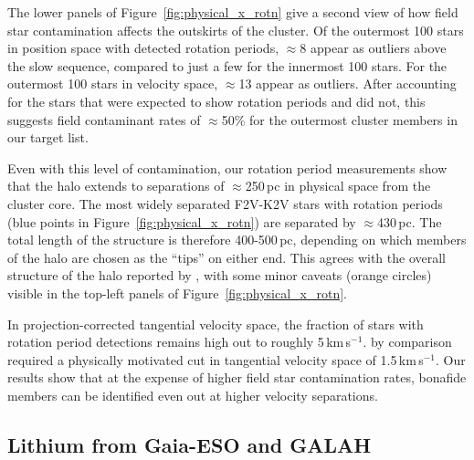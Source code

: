 \documentclass[12pt,twocolumn,tighten]{aastex63}
\newcommand{\kms}{\,km\,s$^{-1}$}
\begin{document}
The lower panels of Figure~\ref{fig:physical_x_rotn} give a second
view of how field star contamination affects the outskirts of the
cluster.  Of the outermost 100 stars in position space with detected
rotation periods, $\approx$8 appear as outliers above the slow
sequence, compared to just a few for the innermost 100 stars.  For the
outermost 100 stars in velocity space, $\approx$13 appear as outliers.
After accounting for the stars that were expected to show rotation
periods and did not, this suggests field contaminant rates of
$\approx$50\% for the outermost cluster members in our target list.

Even with this level of contamination, our rotation period
measurements show that the halo extends to separations of
$\approx$250\,pc in physical space from the cluster core.  The most
widely separated F2V-K2V stars with rotation periods (blue points in
Figure~\ref{fig:physical_x_rotn}) are separated by $\approx$430\,pc.
The total length of the structure is therefore 400-500\,pc, depending
on which members of the halo are chosen as the ``tips'' on either end.
This agrees with the overall structure of the halo reported by
, with some minor caveats (orange
circles) visible in the top-left panels of
Figure~\ref{fig:physical_x_rotn}.

In projection-corrected tangential velocity space, the fraction of
stars with rotation period detections remains high out to roughly
5\kms.  \citet{meingast_2021} by comparison required a physically
motivated cut in tangential velocity space of 1.5\kms.  Our results
show that at the expense of higher field star contamination rates,
bonafide members can be identified even out at higher velocity
separations.


\subsection{Lithium from Gaia-ESO and GALAH}
\label{subsec:lithium}
\end{document}
